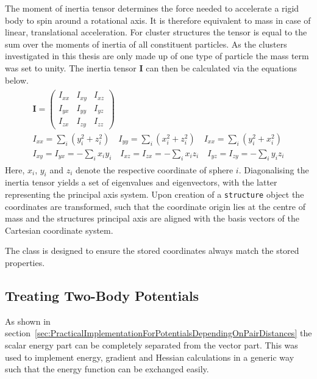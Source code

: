 The moment of inertia tensor determines the force needed to accelerate a rigid
body to spin around a rotational axis. It is therefore equivalent to mass in
case of linear, translational acceleration. For cluster structures the tensor
is equal to the sum over the moments of inertia of all constituent particles.
As the clusters investigated in this thesis are only made up of one type of
particle the mass term was set to unity. The inertia tensor $\mathbf{I}$ can
then be calculated via the equations below.
%
\begin{gather}
    \begin{gathered}
    \mathbf{I}=
    \begin{pmatrix}
        I_{xx} & I_{xy} & I_{xz}\\
        I_{yx} & I_{yy} & I_{yz}\\
        I_{zx} & I_{zy} & I_{zz}
    \end{pmatrix}\\
    I_{xx}=\sum_i(y_i^2+z_i^2) \quad I_{yy}=\sum_i(x_i^2+z_i^2) \quad I_{xx}=\sum_i(y_i^2+x_i^2)\\
    I_{xy} = I_{yx} = -\sum_ix_iy_i \quad I_{xz} = I_{zx} = -\sum_ix_iz_i \quad I_{yz} = I_{zy} = -\sum_iy_iz_i
    \end{gathered}
\end{gather}
%
Here, $x_i$, $y_i$ and $z_i$ denote the respective coordinate of sphere $i$.
Diagonalising the inertia tensor yields a set of eigenvalues and eigenvectors,
with the latter representing the principal axis system. Upon creation of a
\verb|structure| object the coordinates are transformed, such that the
coordinate origin lies at the centre of mass and the structures principal axis
are aligned with the basis vectors of the Cartesian coordinate system.

The class is designed to ensure the stored coordinates always match the stored
properties.


\subsection{Treating Two-Body Potentials}
\label{sec:thepairpotentialclass}

As shown in
section~\ref{sec:PracticalImplementationForPotentialsDependingOnPairDistances}
the scalar energy part can be completely separated from the vector part. This
was used to implement energy, gradient and Hessian calculations in a generic
way such that the energy function can be exchanged easily. 

